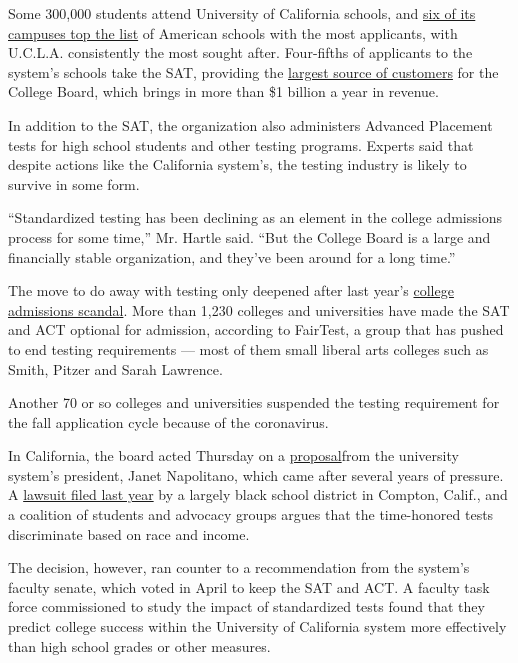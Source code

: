 Some 300,000 students attend University of California schools, and
\href{https://www.usnews.com/education/best-colleges/the-short-list-college/articles/colleges-that-received-the-most-applications}{six
of its campuses top the list} of American schools with the most
applicants, with U.C.L.A. consistently the most sought after.
Four-fifths of applicants to the system's schools take the SAT,
providing the
\href{https://www.latimes.com/california/story/2020-05-11/napolitano-says-suspend-the-sat-test-for-uc-admissions}{largest
source of customers} for the College Board, which brings in more than
\$1 billion a year in revenue.

In addition to the SAT, the organization also administers Advanced
Placement tests for high school students and other testing programs.
Experts said that despite actions like the California system's, the
testing industry is likely to survive in some form.

``Standardized testing has been declining as an element in the college
admissions process for some time,'' Mr. Hartle said. ``But the College
Board is a large and financially stable organization, and they've been
around for a long time.''

The move to do away with testing only deepened after last year's
\href{https://www.nytimes.com/2019/03/12/us/college-admissions-cheating-scandal.html}{college
admissions scandal}. More than 1,230 colleges and universities have made
the SAT and ACT optional for admission, according to FairTest, a group
that has pushed to end testing requirements --- most of them small
liberal arts colleges such as Smith, Pitzer and Sarah Lawrence.

Another 70 or so colleges and universities suspended the testing
requirement for the fall application cycle because of the coronavirus.

In California, the board acted Thursday on a
\href{https://regents.universityofcalifornia.edu/regmeet/may20/b4.pdf}{proposal}from
the university system's president, Janet Napolitano, which came after
several years of pressure. A
\href{http://www.publiccounsel.org/tools/assets/files/1250.pdf}{lawsuit
filed last year} by a largely black school district in Compton, Calif.,
and a coalition of students and advocacy groups argues that the
time-honored tests discriminate based on race and income.

The decision, however, ran counter to a recommendation from the system's
faculty senate, which voted in April to keep the SAT and ACT. A faculty
task force commissioned to study the impact of standardized tests found
that they predict college success within the University of California
system more effectively than high school grades or other measures.


